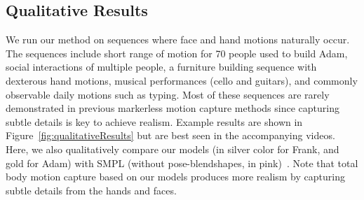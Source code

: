 


\subsection{Qualitative Results}
We run our method on sequences where face and hand motions naturally occur. The sequences include short range of motion for 70 people used to build Adam, social interactions of multiple people, a furniture building sequence with dexterous hand motions, musical performances (cello and guitars), and commonly observable daily motions such as typing. Most of these sequences are rarely demonstrated in previous markerless motion capture methods since capturing subtle details is key to achieve realism.  Example results are shown in Figure~\ref{fig:qualitativeResults} but are best seen in the accompanying videos. Here, we also qualitatively compare our models (in silver color for Frank, and gold for Adam) with SMPL (without pose-blendshapes, in pink)~\cite{Loper2015}. Note that total body motion capture based on our models produces more realism by capturing subtle details from the hands and faces.


